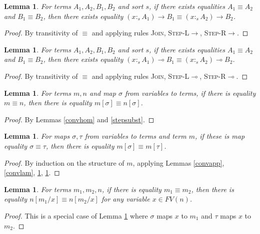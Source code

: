 \documentclass{article}
\newtheorem{lemma}[theorem]{Lemma}
\theoremstyle{definition}
\newcommand{\rname}[1]{\textsc{\footnotesize #1}}
\newcommand{\stype}[1]{:_{#1}}
\begin{document}
\begin{lemma}\label{convarrow}
  For terms $A_1, A_2, B_1, B_2$ and sort $s$, if there exists equalities $A_1 \equiv A_2$ and $B_1 \equiv B_2$, then there exists equality $(x \stype{s} A_1) \rightarrow B_1 \equiv (x \stype{s} A_2) \rightarrow B_2$.
\end{lemma}
\begin{proof}
  By transitivity of $\equiv$ and applying rules \rname{Join}, \rname{Step-L$\rightarrow$}, \rname{Step-R$\rightarrow$}.
\end{proof}

\begin{lemma}\label{convlolli}
  For terms $A_1, A_2, B_1, B_2$ and sort $s$, if there exists equalities $A_1 \equiv A_2$ and $B_1 \equiv B_2$, then there exists equality $(x \stype{s} A_1) \multimap B_1 \equiv (x \stype{s} A_2) \multimap B_2$.
\end{lemma}
\begin{proof}
  By transitivity of $\equiv$ and applying rules \rname{Join}, \rname{Step-L$\multimap$}, \rname{Step-R$\multimap$}.
\end{proof}

\begin{lemma}\label{convsubst}
  For terms $m, n$ and map $\sigma$ from variables to terms, if there is equality $m \equiv n$, then there is equality $m[\sigma] \equiv n[\sigma]$.
\end{lemma}
\begin{proof}
  By Lemmas \ref{convhom} and \ref{stepsubst}.
\end{proof}

\begin{lemma}\label{convcompat}
  For maps $\sigma, \tau$ from variables to terms and term $m$, if these is map equality $\sigma \equiv \tau$, then there is equality $m[\sigma] \equiv m[\tau]$.
\end{lemma}
\begin{proof}
  By induction on the structure of $m$, applying Lemmas \ref{convapp}, \ref{convlam}, \ref{convarrow}, \ref{convlolli}.
\end{proof}

\begin{lemma}
  For terms $m_1, m_2, n$, if there is equality $m_1 \equiv m_2$, then there is equality $n[m_1/x] \equiv n[m_2/x]$ for any variable $x \in FV(n)$.
\end{lemma}
\begin{proof}
  This is a special case of Lemma \ref{convcompat} where $\sigma$ maps $x$ to $m_1$ and $\tau$ maps $x$ to $m_2$.
\end{proof}
\end{document}
